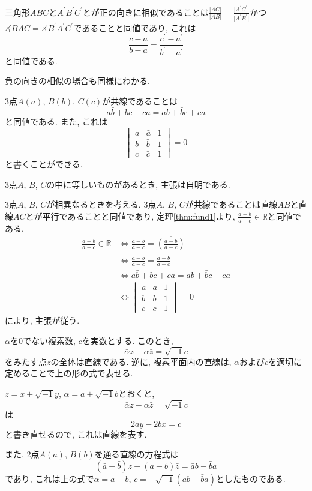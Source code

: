 \begin{prf*}
三角形$ABC$と$A^\prime B^\prime C^\prime$とが正の向きに相似であることは$\frac{\lvert AC\rvert}{\lvert AB\rvert}=\frac{\lvert A^\prime C^\prime\rvert}{\lvert A^\prime B^\prime\rvert}$かつ$\measuredangle BAC=\measuredangle B^\prime A^\prime C^\prime$であることと同値であり,
これは
\[\frac{c-a}{b-a}=\frac{c^\prime-a^\prime}{b^\prime-a^\prime}\]
と同値である.

負の向きの相似の場合も同様にわかる.
\end{prf*}
%
%
\begin{bthm}\label{thm:colinearity1}
$3$点$A(a)$, $B(b)$, $C(c)$が共線であることは
\[
a\bar{b}+b\bar{c}+c\bar{a}=\bar{a}b+\bar{b}c+\bar{c}a
\]
と同値である.
また, これは
\[
\begin{vmatrix}a&\bar{a}&1\\b&\bar{b}&1\\c&\bar{c}&1\end{vmatrix}=0
\]
と書くことができる.
\end{bthm}
\begin{prf*}
$3$点$A$, $B$, $C$の中に等しいものがあるとき, 主張は自明である.

$3$点$A$, $B$, $C$が相異なるときを考える.
$3$点$A$, $B$, $C$が共線であることは直線$AB$と直線$AC$とが平行であることと同値であり, 定理\ref{thm:fund1}より, $\frac{a-b}{a-c}\in\mathbb{R}$と同値である.
\[
\begin{aligned}
\frac{a-b}{a-c}\in\mathbb{R}&\iff\frac{a-b}{a-c}=\overline{\left(\frac{a-b}{a-c}\right)}\\
&\iff\frac{a-b}{a-c}=\frac{\bar{a}-\bar{b}}{\bar{a}-\bar{c}}\\
&\iff a\bar{b}+b\bar{c}+c\bar{a}=\bar{a}b+\bar{b}c+\bar{c}a\\
&\iff\begin{vmatrix}a&\bar{a}&1\\b&\bar{b}&1\\c&\bar{c}&1\end{vmatrix}=0
\end{aligned}
\]
により, 主張が従う.
\end{prf*}
%
%
\begin{bthm}
$\alpha$を$0$でない複素数, $c$を実数とする.
このとき,
\[\bar\alpha z-\alpha\bar z=\sqrt{-1}c\]
をみたす点$z$の全体は直線である.
逆に, 複素平面内の直線は, $\alpha$および$c$を適切に定めることで上の形の式で表せる.
\end{bthm}
\begin{prf*}
$z=x+\sqrt{-1}y$, $\alpha=a+\sqrt{-1}b$とおくと,
\[\bar\alpha z-\alpha\bar z=\sqrt{-1}c\]
は
\[2ay-2bx=c\]
と書き直せるので, これは直線を表す.

また, $2$点$A(a)$, $B(b)$を通る直線の方程式は
\[(\bar a-\bar b)z-(a-b)\bar z=\bar ab-\bar ba\]
であり, これは上の式で$\alpha=a-b$, $c=-\sqrt{-1}(\bar ab-\bar ba)$としたものである.
\end{prf*}

